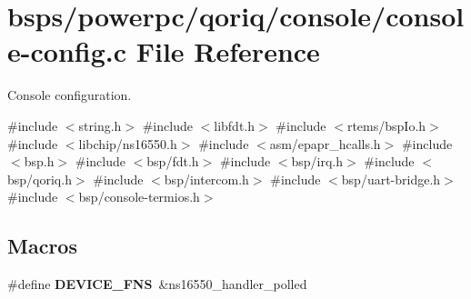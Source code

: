 \hypertarget{powerpc_2qoriq_2console_2console-config_8c}{}\section{bsps/powerpc/qoriq/console/console-\/config.c File Reference}
\label{powerpc_2qoriq_2console_2console-config_8c}


Console configuration.  


{\ttfamily \#include $<$string.\+h$>$}\newline
{\ttfamily \#include $<$libfdt.\+h$>$}\newline
{\ttfamily \#include $<$rtems/bsp\+Io.\+h$>$}\newline
{\ttfamily \#include $<$libchip/ns16550.\+h$>$}\newline
{\ttfamily \#include $<$asm/epapr\+\_\+hcalls.\+h$>$}\newline
{\ttfamily \#include $<$bsp.\+h$>$}\newline
{\ttfamily \#include $<$bsp/fdt.\+h$>$}\newline
{\ttfamily \#include $<$bsp/irq.\+h$>$}\newline
{\ttfamily \#include $<$bsp/qoriq.\+h$>$}\newline
{\ttfamily \#include $<$bsp/intercom.\+h$>$}\newline
{\ttfamily \#include $<$bsp/uart-\/bridge.\+h$>$}\newline
{\ttfamily \#include $<$bsp/console-\/termios.\+h$>$}\newline
\subsection*{Macros}
\begin{DoxyCompactItemize}
\item 
\mbox{\label{powerpc_2qoriq_2console_2console-config_8c_aa1e88fec2a0add03b025c33d9c965738}} 
\#define {\bfseries D\+E\+V\+I\+C\+E\+\_\+\+F\+NS}~\&ns16550\+\_\+handler\+\_\+polled
\end{DoxyCompactItemize}
